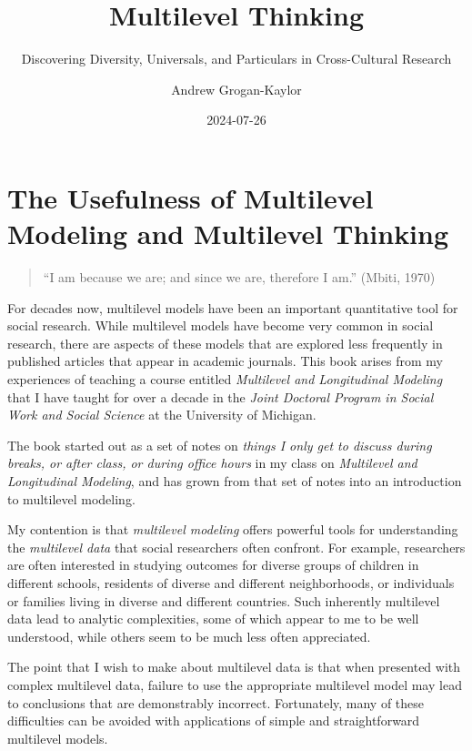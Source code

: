 \documentclass[
  letterpaper,
  DIV=11,
  numbers=noendperiod]{scrreprt}
\title{Multilevel Thinking}
\subtitle{Discovering Diversity, Universals, and Particulars in
Cross-Cultural Research}
\author{Andrew Grogan-Kaylor}
\date{2024-07-26}
\renewcommand*\contentsname{Table of contents}
\newcommand\contentsname{Table of contents}
\begin{document}
\maketitle

\renewcommand*\contentsname{Table of contents}
{
\hypersetup{linkcolor=}
\setcounter{tocdepth}{2}
\tableofcontents
}
\listoffigures
\listoftables
{}

\chapter{The Usefulness of Multilevel Modeling and Multilevel
Thinking}\label{sec-multilevel-thinking}

\begin{quote}
``I am because we are; and since we are, therefore I am.'' (Mbiti, 1970)
\end{quote}

For decades now, multilevel models have been an important quantitative
tool for social research. While multilevel models have become very
common in social research, there are aspects of these models that are
explored less frequently in published articles that appear in academic
journals. This book arises from my experiences of teaching a course
entitled \emph{Multilevel and Longitudinal Modeling} that I have taught
for over a decade in the \emph{Joint Doctoral Program in Social Work and
Social Science} at the University of Michigan.

The book started out as a set of notes on \emph{things I only get to
discuss during breaks, or after class, or during office hours} in my
class on \emph{Multilevel and Longitudinal Modeling}, and has grown from
that set of notes into an introduction to multilevel modeling.

My contention is that \emph{multilevel modeling} offers powerful tools
for understanding the \emph{multilevel data} that social researchers
often confront. For example, researchers are often interested in
studying outcomes for diverse groups of children in different schools,
residents of diverse and different neighborhoods, or individuals or
families living in diverse and different countries. Such inherently
multilevel data lead to analytic complexities, some of which appear to
me to be well understood, while others seem to be much less often
appreciated.

The point that I wish to make about multilevel data is that when
presented with complex multilevel data, failure to use the appropriate
multilevel model may lead to conclusions that are demonstrably
incorrect. Fortunately, many of these difficulties can be avoided with
applications of simple and straightforward multilevel models.
 
\end{document}

